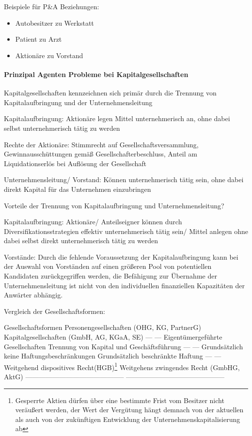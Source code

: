 \documentclass[
]{article}
\providecommand{\tightlist}{%
  \setlength{\itemsep}{0pt}\setlength{\parskip}{0pt}}
\begin{document}
Beispiele für P\&A Beziehungen:

\begin{itemize}
\tightlist
\item
  Autobesitzer zu Werkstatt
\item
  Patient zu Arzt
\item
  Aktionäre zu Vorstand
\end{itemize}

\hypertarget{prinzipal-agenten-probleme-bei-kapitalgesellschaften}{%
\paragraph{Prinzipal Agenten Probleme bei
Kapitalgesellschaften}\label{prinzipal-agenten-probleme-bei-kapitalgesellschaften}}

Kapitalgesellschaften kennzeichnen sich primär durch die Trennung von
Kapitalaufbringung und der Unternehmensleitung

Kapitalaufbringung: Aktionäre legen Mittel unternehmerisch an, ohne
dabei selbst unternehmerisch tätig zu werden

Rechte der Aktionäre: Stimmrecht auf Gesellschaftsversammlung,
Gewinnausschüttungen gemäß Gesellschafterbeschluss, Anteil am
Liquidationserlös bei Auflösung der Gesellschaft

Unternehmensleitung/ Vorstand: Können unternehmerisch tätig sein, ohne
dabei direkt Kapital für das Unternehmen einzubringen

Vorteile der Trennung von Kapitalaufbringung und Unternehmensleitung?

Kapitalaufbringung: Aktionäre/ Anteilseigner können durch
Diversifikationsstrategien effektiv unternehmerisch tätig sein/ Mittel
anlegen ohne dabei selbst direkt unternehmerisch tätig zu werden

Vorstände: Durch die fehlende Voraussetzung der Kapitalaufbringung kann
bei der Auswahl von Vorständen auf einen größeren Pool von potentiellen
Kandidaten zurückgegriffen werden, die Befähigung zur Übernahme der
Unternehmensleitung ist nicht von den individuellen finanziellen
Kapazitäten der Anwärter abhängig.

Vergleich der Gesellschaftsformen:

Gesellschaftsformen Personengesellschaften (OHG, KG, PartnerG)
\textbar{} Kapitalgesellschaften (GmbH, AG, KGaA, SE) --- \textbar{} ---
Eigentümergeführte Gesellschaften \textbar{} Trennung von Kapital und
Geschäftsführung --- \textbar{} --- Grundsätzlich keine
Haftungsbeschränkungen \textbar{} Grundsätzlich beschränkte Haftung ---
\textbar{} --- Weitgehend dispositives Recht(HGB)\footnote{Gesperrte
  Aktien dürfen über eine bestimmte Frist vom Besitzer nicht veräußert
  werden, der Wert der Vergütung hängt demnach von der aktuellen als
  auch von der zukünftigen Entwicklung der Unternehmenskapitalisierung
  ab} \textbar{} Weitgehens zwingendes Recht (GmbHG, AktG)
--------------------------------------------
--------------------------------------------
\end{document}
